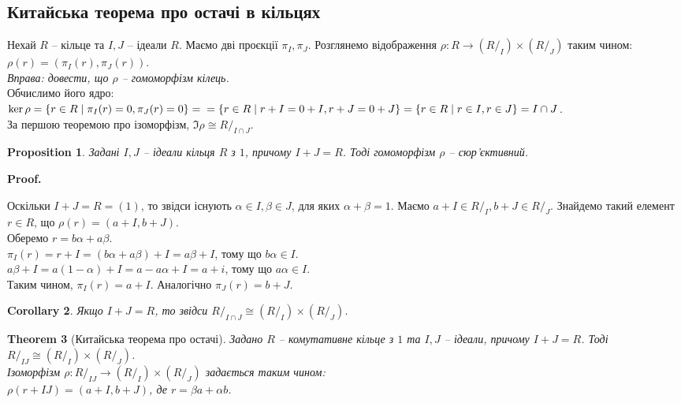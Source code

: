 \documentclass[a4paper, 10pt]{article}
\makeatletter
\theoremstyle{theoremdd}
\newtheorem{theorem}{Theorem}[subsection]
\theoremstyle{theoremdd}
\theoremstyle{theoremdd}
\theoremstyle{theoremdd}
\theoremstyle{theoremdd}
\theoremstyle{theoremdd}
\theoremstyle{theoremdd}
\theoremstyle{theoremdd}
\theoremstyle{theoremdd}
\newtheorem{proposition}[theorem]{Proposition}
\theoremstyle{theoremdd}
\theoremstyle{theoremdd}
\theoremstyle{theoremdd}
\theoremstyle{theoremdd}
\theoremstyle{theoremdd}
\newtheorem{corollary}[theorem]{Corollary}
\theoremstyle{theoremdd}
\renewenvironment{proof}[1][Proof.\\]{\par
\pushQED{\hfill \qed}%
\normalfont \topsep6\p@\@plus6\p@\relax
\trivlist
\item\relax
{\bfseries
#1\@addpunct{.}}\hspace\labelsep\ignorespaces
}{%
\popQED\endtrivlist\@endpefalse
}
\makeatother
\begin{document}
\subsection{Китайська теорема про остачі в кільцях}
Нехай $R$ -- кільце та $I,J$ -- ідеали $R$. Маємо дві проєкції $\pi_I, \pi_J$. Розглянемо відображення $\rho \colon R \to (R/_I) \times (R/_J)$ таким чином:\\
$\rho(r) = (\pi_I(r),\pi_J(r))$.\\
\textit{Вправа: довести, що $\rho$ -- гомоморфізм кілець.}\\
Обчислимо його ядро:\\
$\ker \rho = \{r \in R \mid \pi_I(r) = 0, \pi_J(r) = 0\} = \\ = \{r \in R \mid r+I = 0+I, r+J = 0+J\} = \{r \in R \mid r \in I, r \in J\} = I \cap J$.\\
За першою теоремою про ізоморфізм, $\Im \rho \cong R/_{I \cap J}$.

\begin{proposition}
Задані $I,J$ -- ідеали кільця $R$ з $1$, причому $I+J = R$. Тоді гомоморфізм $\rho$ -- сюр'єктивний.
\end{proposition}

\begin{proof}
Оскільки $I+J = R = (1)$, то звідси існують $\alpha \in I, \beta \in J$, для яких $\alpha + \beta = 1$. Маємо $a+I \in R/_I, b+J \in R/_J$. Знайдемо такий елемент $r \in R$, що $\rho(r) = (a+I,b+J)$.\\
Оберемо $r = b \alpha + a \beta$.\\
$\pi_I(r) = r+I = (b\alpha + a \beta) + I = a \beta + I$, тому що $b\alpha \in I$.\\
$a \beta + I = a(1-\alpha) + I = a - a \alpha + I = a + i$, тому що $a \alpha \in I$.\\
Таким чином, $\pi_I(r) = a+I$. Аналогічно $\pi_J(r) = b+J$.
\end{proof}

\begin{corollary}
Якщо $I+J = R$, то звідси $R/_{I \cap J} \cong (R/_I) \times (R/_J)$.
\end{corollary}

\begin{theorem}[Китайська теорема про остачі]
Задано $R$ -- комутативне кільце з $1$ та $I,J$ -- ідеали, причому $I+J = R$. Тоді $R/_{IJ} \cong (R/_I) \times (R/_J)$. \\ Ізоморфізм $\rho \colon R/_{IJ} \to (R/_I) \times (R/_J)$ задається таким чином:\\
$\rho(r + IJ) = (a+I, b+J)$, де $r = \beta a + \alpha b$.
\end{theorem}
\end{document}
